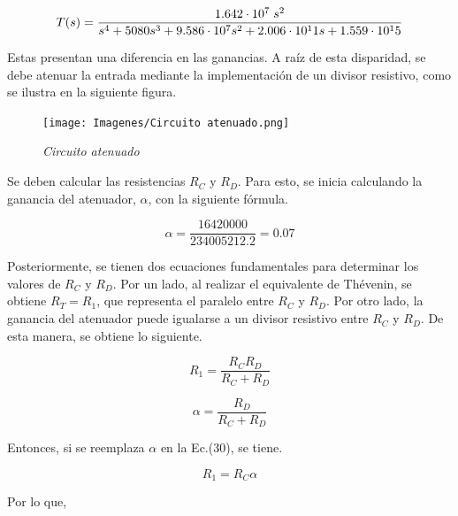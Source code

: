 \documentclass[12pt,A4paper,titlepage]{article}
\begin{document}
\begin{equation}
   T(s) = \frac{1.642 \cdot 10^7 \hspace{1mm} s^2}{s^4 + 5080 s^3 + 9.586 \cdot 10^7 s^2 + 2.006 \cdot 10^11 s + 1.559 \cdot 10^15}
\end{equation}

\bigskip
\hspace{1mm} Estas presentan una diferencia en las ganancias. A raíz de esta disparidad, se debe atenuar la entrada mediante la implementación de un divisor resistivo, como se ilustra en la siguiente figura.

\begin{figure}[!h] 
  \centering
  \texttt{[image: Imagenes/Circuito atenuado.png]}
  \caption{\textit{Circuito atenuado}}
\end{figure}


\hspace{1mm} Se deben calcular las resistencias \(R_C\) y \(R_D\). Para esto, se inicia calculando la ganancia del atenuador, \(\alpha\), con la siguiente fórmula.

\begin{equation}
    \alpha = \frac{16 420 000}{234 005 212.2} = 0.07
\end{equation}

\bigskip
\hspace{1mm} Posteriormente, se tienen dos ecuaciones fundamentales para determinar los valores de \(R_C\) y \(R_D\). Por un lado, al realizar el equivalente de Thévenin, se obtiene \(R_{T} = R_1\), que representa el paralelo entre \(R_C\) y \(R_D\). Por otro lado, la ganancia del atenuador puede igualarse a un divisor resistivo entre \(R_C\) y \(R_D\). De esta manera, se obtiene lo siguiente.

\begin{equation}
    R_1 = \frac{R_C R_D}{R_C + R_D}
\end{equation}

\begin{equation}
    \alpha = \frac{R_D}{R_C + R_D}
\end{equation}

\bigskip
\hspace{1mm} Entonces, si se reemplaza \(\alpha \) en la Ec.(30), se tiene.

\begin{equation*}
    R_1=R_C\alpha 
\end{equation*}

\hspace{1mm} Por lo que, 
\end{document}
